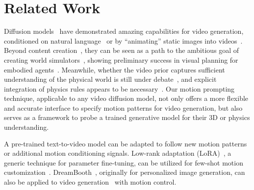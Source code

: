 \section{Related Work}
\label{sec:related_work}

Diffusion models~\cite{sohldickstein2015diffusion,ho2020denoising,song2020denoising} have demonstrated amazing capabilities for video generation, conditioned on natural language~\cite{ho2022video,ho2022imagen,guo2023animatediff,girdhar2023emu,bar2024lumiere} or by ``animating'' static images into videos~\cite{singer2022make,blattmann2023stable,xing2024dynamicrafter}.
Beyond content creation~\cite{polyak2024movie}, they can be seen as a path to the ambitious goal of creating world simulators~\cite{videoworldsimulators2024}, showing preliminary success in visual planning for embodied agents~\cite{du2024learning,escontrela2024video,yang2024video}.
Meanwhile, whether the video prior captures sufficient understanding of the physical world is still under debate~\cite{kang2024far}, and explicit integration of physics rules appears to be necessary~\cite{yuan2023physdiff,liu2024physgen,yu2024lucidsim}. 
Our motion prompting technique, applicable to any video diffusion model, not only offers a more flexible and accurate interface to specify motion patterns for video generation, but also serves as a framework to probe %
a trained generative model for their 3D or physics understanding.

A pre-trained text-to-video model can be adapted to follow new motion patterns or additional motion conditioning signals.
Low-rank adaptation (LoRA)~\cite{hu2021lora}, a generic technique for parameter fine-tuning, can be utilized for few-shot motion customization~\cite{ren2024customize,zhao2025motiondirector}.
DreamBooth~\cite{ruiz2022dreambooth}, originally for personalized image generation, can also be applied to video generation~\cite{wu2024motionbooth} with motion control.

